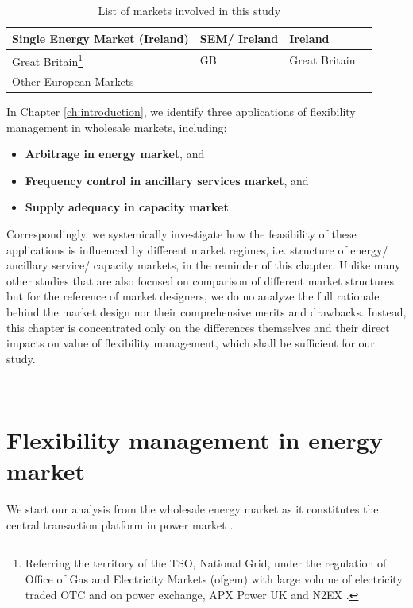 \begin{table}[h!]
\begin{tabular}{L{5cm} l l l}
		\hline
		Single Energy Market (Ireland) & SEM/ Ireland & Ireland & \cite{FrontierEconomics2016,Cochran2013}\\
		\hline
		Great Britain\footnote{Referring the territory of the TSO, National Grid, under the regulation of Office of Gas and Electricity Markets (ofgem) with large volume of electricity traded OTC and on power exchange, APX Power UK and N2EX .} & GB & Great Britain & \cite{Rebours2009,FrontierEconomics2016,ofgem_cm,ofgem_m,EnergyUK2017} \\
		\hline
		Other European Markets & - & - & \cite{FrontierEconomics2016}\\
		\hline
		\hline
	\end{tabular}
	\caption{List of markets involved in this study} \label{tab:markets}
\end{table}

In Chapter \ref{ch:introduction}, we identify three applications of flexibility management in wholesale markets, including:

\begin{itemize}
	\item \textbf{Arbitrage in energy market}, and
	\item \textbf{Frequency control in ancillary services market}, and
	\item \textbf{Supply adequacy in capacity market}. 
\end{itemize}

Correspondingly, we systemically investigate how the feasibility of these applications is influenced by different market regimes, i.e. structure of energy/ ancillary service/ capacity markets, in the reminder of this chapter. Unlike many other studies that are also focused on comparison of different market structures but for the reference of market designers, we do no analyze the full rationale behind the market design nor their comprehensive merits and drawbacks. Instead, this chapter is concentrated only on the differences themselves and their direct impacts on value of flexibility management, which shall be sufficient for our study.


~\newpage

\section{Flexibility management in energy market}
We start our analysis from the wholesale energy market as it constitutes the central transaction platform in power market \cite{Cochran2013}. 

